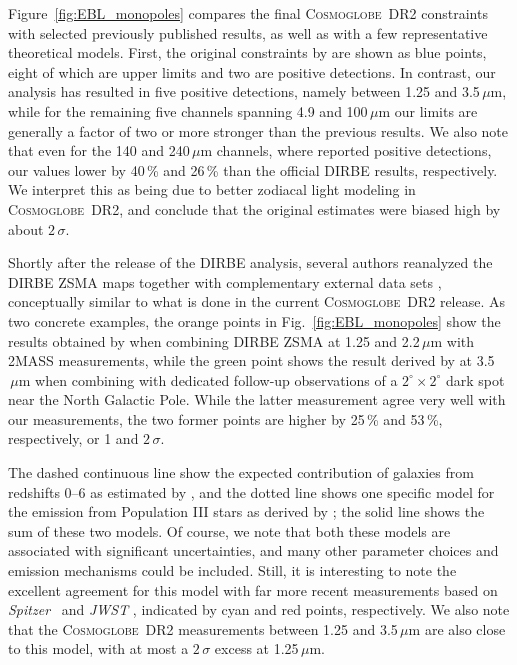 \documentclass{aa}
\def\Spitzer{\textit{Spitzer}}
\newcommand{\cosmoglobe}{\textsc{Cosmoglobe}}
\begin{document}
Figure~\ref{fig:EBL_monopoles} compares the final \cosmoglobe\ DR2
constraints with selected previously published results, as well as
with a few representative theoretical models. First, the original
constraints by \citet{hauser1998} are shown as blue points, eight of
which are upper limits and two are positive detections. In
contrast, our analysis has resulted in five positive detections,
namely between 1.25 and 3.5\,$\mu\mathrm{m}$, while for the remaining
five channels spanning 4.9 and 100$\,\mu\mathrm{m}$ our limits are
generally a factor of two or more stronger than the previous
results. We also note that even for the 140 and 240$\,\mu\mathrm{m}$
channels, where \citet{hauser1998} reported positive detections, 
our values lower by 40\,\% and 26\,\% than the official DIRBE results,
respectively. We interpret this as being due to better zodiacal light
modeling in \cosmoglobe\ DR2, and conclude that the
original estimates were biased high by about $2\,\sigma$.

Shortly after the release of the DIRBE analysis, several authors
reanalyzed the DIRBE ZSMA maps together with complementary external
data sets \citep[e.g.,][]{wright:2000,wright:2001}, conceptually
similar to what is done in the current \cosmoglobe\ DR2 release. As
two concrete examples, the orange points in
Fig.~\ref{fig:EBL_monopoles} show the results obtained by
\citet{cambresy:2001} when combining DIRBE ZSMA at 1.25 and
2.2$\,\mu\mathrm{m}$ with 2MASS measurements, while the green point
shows the result derived by \citet{gorjian:2000} at
3.5$\,\mu\mathrm{m}$ when combining with dedicated follow-up
observations of a $2^{\circ}\times2^{\circ}$ dark spot near the North
Galactic Pole. While the latter measurement agree very well with our
measurements, the two former points are higher by 25\,\% and 53\,\%,
respectively, or 1 and $2\,\sigma$.

The dashed continuous line show the expected contribution of 
galaxies from redshifts 0--6 as estimated by \citet{finke2022}, and the
dotted line shows one specific model for the emission from Population III
stars as derived by \citet{santos:2002}; the solid line shows the sum
of these two models. Of course, we note that both these models are
associated with significant uncertainties, and many other parameter
choices and emission mechanisms could be included. Still, it is
interesting to note the excellent agreement for this model with far
more recent measurements based on \Spitzer\ \citep{bethermin:2010} and
\textit{JWST} \citep{stone:2024}, indicated by cyan and red points,
respectively. We also note that the \cosmoglobe\ DR2 measurements
between 1.25 and 3.5$\,\mu\mathrm{m}$ are also close to this model,
with at most a $2\,\sigma$ excess at 1.25$\,\mu\mathrm{m}$.
\end{document}
